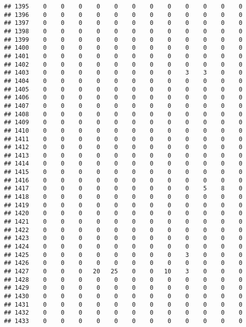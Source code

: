 \documentclass[]{article}
\begin{document}
\begin{verbatim}
## 1395    0    0    0    0    0    0    0    0    0    0    0    0
## 1396    0    0    0    0    0    0    0    0    0    0    0    0
## 1397    0    0    0    0    0    0    0    0    0    0    0    0
## 1398    0    0    0    0    0    0    0    0    0    0    0    0
## 1399    0    0    0    0    0    0    0    0    0    0    0    0
## 1400    0    0    0    0    0    0    0    0    0    0    0    0
## 1401    0    0    0    0    0    0    0    0    0    0    0    0
## 1402    0    0    0    0    0    0    0    0    0    0    0    0
## 1403    0    0    0    0    0    0    0    0    3    3    0    0
## 1404    0    0    0    0    0    0    0    0    0    0    0    0
## 1405    0    0    0    0    0    0    0    0    0    0    0    0
## 1406    0    0    0    0    0    0    0    0    0    0    0    0
## 1407    0    0    0    0    0    0    0    0    0    0    0    0
## 1408    0    0    0    0    0    0    0    0    0    0    0    0
## 1409    0    0    0    0    0    0    0    0    0    0    0    0
## 1410    0    0    0    0    0    0    0    0    0    0    0    0
## 1411    0    0    0    0    0    0    0    0    0    0    0    0
## 1412    0    0    0    0    0    0    0    0    0    0    0    0
## 1413    0    0    0    0    0    0    0    0    0    0    0    0
## 1414    0    0    0    0    0    0    0    0    0    0    0    0
## 1415    0    0    0    0    0    0    0    0    0    0    0    0
## 1416    0    0    0    0    0    0    0    0    0    0    0    0
## 1417    0    0    0    0    0    0    0    0    0    5    8    0
## 1418    0    0    0    0    0    0    0    0    0    0    0    0
## 1419    0    0    0    0    0    0    0    0    0    0    0    0
## 1420    0    0    0    0    0    0    0    0    0    0    0    0
## 1421    0    0    0    0    0    0    0    0    0    0    0    0
## 1422    0    0    0    0    0    0    0    0    0    0    0    0
## 1423    0    0    0    0    0    0    0    0    0    0    0    0
## 1424    0    0    0    0    0    0    0    0    0    0    0    0
## 1425    0    0    0    0    0    0    0    0    3    0    0    0
## 1426    0    0    0    0    0    0    0    0    0    0    0    0
## 1427    0    0    0   20   25    0    0   10    3    0    0    0
## 1428    0    0    0    0    0    0    0    0    0    0    0    0
## 1429    0    0    0    0    0    0    0    0    0    0    0    0
## 1430    0    0    0    0    0    0    0    0    0    0    0    0
## 1431    0    0    0    0    0    0    0    0    0    0    0    0
## 1432    0    0    0    0    0    0    0    0    0    0    0    0
## 1433    0    0    0    0    0    0    0    0    0    0    0    0

\end{verbatim}
\end{document}
